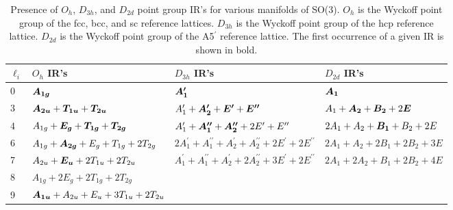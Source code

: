 \documentclass[preprint]{revtex4}
\newcommand{\mb}[1]{\ensuremath{\mbox{\boldmath $ #1 $}}}
\begin{document}
\begin{table}[!ht]
\caption{Presence of $O_h$, $D_{3h}$, and $D_{2d}$ point group IR's for various
manifolds of SO(3). $O_h$ is the Wyckoff point group of the fcc,
bcc, and sc reference lattices. $D_{3h}$ is the Wyckoff point group
of the hcp reference lattice. $D_{2d}$ is the Wyckoff point group
of the A5$^\prime$ reference lattice. The first occurrence of a given IR is
shown in bold.}\label{wyckoff_IRs}\small
\begin{tabular}{llll}\hline
$\ell_i$ & $O_h$ IR's &  $D_{3h}$ IR's &  $D_{2d}$ IR's\\
\hline
0 & $\mb{A_{1g}}$ & $\mb{A^\prime_1}$ & $\mb{A_1}$ \\
3 & $\mb{A_{2u}}+\mb{T_{1u}}+\mb{T_{2u}}$ & $A^\prime_1+\mb{A^{\prime}_2}+\mb{E^\prime}+\mb{E^{\prime\prime}}$ & $A_1+\mb{A_2}+\mb{B_2}+2\mb{E}$\\
4 & $A_{1g}+\mb{E_{g}}+\mb{T_{1g}}+\mb{T_{2g}}$ & $A^\prime_1+\mb{A^{\prime\prime}_1}+\mb{A^{\prime\prime}_2}+2E^\prime+E^{\prime\prime}$ & $2A_1+A_2+\mb{B_1}+B_2+2E$\\
6 & $A_{1g}+\mb{A_{2g}}+E_g+T_{1g}+2T_{2g}$ & $2A^\prime_1+A^{\prime\prime}_1+A^{\prime}_2+A^{\prime\prime}_2+2E^\prime+2E^{\prime\prime}$ & $2A_1+A_2+2B_1+2B_2+3E$\\
7 & $A_{2u}+\mb{E_u}+2T_{1u}+2T_{2u}$ & $A^\prime_1+A^{\prime\prime}_1+A^{\prime}_2+2A^{\prime\prime}_2+3E^\prime+2E^{\prime\prime}$ & $2A_1+2A_2+B_1+2B_2+4E$\\
8 & $A_{1g}+2E_g+2T_{1g}+2T_{2g}$ & \\
9 & $\mb{A_{1u}}+A_{2u}+E_u+3T_{1u}+2T_{2u}$ & \\
\hline
\end{tabular}
\end{table}

\pagebreak
\end{document}
